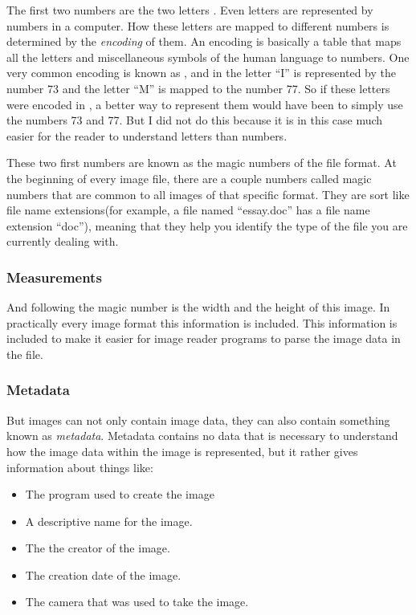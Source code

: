 The first two numbers are the two letters \im. Even letters are
represented by numbers in a computer. How these letters are mapped to
different numbers is determined by the \textit{encoding} of them. An
encoding is basically a table that maps all the letters and
miscellaneous symbols of the human language to numbers. One very
common encoding is known as \ascii, and in \ascii the letter ``I'' is
represented by the number 73 and the letter ``M'' is mapped to the
number 77. So if these letters were encoded in \ascii, a better way to
represent them would have been to simply use the numbers 73 and
77. But I did not do this because it is in this case much easier for
the reader to understand letters than numbers.

These two first numbers are known as the magic numbers of the file
format. At the beginning of every image file, there are a couple
numbers called magic numbers that are common to all images of that
specific format. They are sort like file name extensions(for example,
a file named ``essay.doc'' has a file name extension ``doc''), meaning
that they help you identify the type of the file you are currently
dealing with.

\subsubsection{Measurements}

And following the magic number is the width and the height of this
image. In practically every image format this information is
included. This information is included to make it easier for image
reader programs to parse the image data in the file.

\subsubsection{Metadata}

But images can not only contain image data, they can also contain
something known as \textit{metadata}. Metadata contains no data that
is necessary to understand how the image data within the image is
represented, but it rather gives information about things like:

\begin{itemize}
\item The program used to create the image
\item A descriptive name for the image.
\item The the creator of the image.
\item The creation date of the image.
\item The camera that was used to take the image.
\end{itemize}

